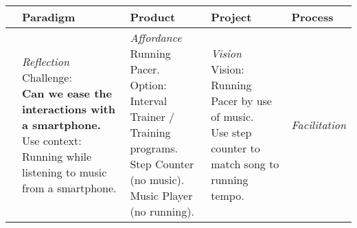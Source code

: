 \begin{table}
\begin{tabular}{l|l|l|l|l}
         & \textbf{Paradigm} & \textbf{Product} & \textbf{Project} & \textbf{Process} \\ \hline
\parbox[t][4cm][c]{0.02\textwidth}{} %
	& \parbox[t]{0.20\textwidth}{\small 
		\textit{Reflection} \newline
		Challenge: \newline
		\textbf{\color{darkGreen}Can we ease the interactions with a smartphone.} \newline
		Use context: \newline
		Running while listening to music from a smartphone.
	}
	& \parbox[t]{0.20\textwidth}{\small 
		\textit{Affordance} \newline
		Running Pacer. \newline
		Option: \newline
		Interval Trainer / Training programs. \newline
		Step Counter (no music). \newline
		Music Player (no running). \newline
	}
	& \parbox[t]{0.20\textwidth}{\small  
		\textit{Vision} \newline
		Vision: \newline
		Running Pacer by use of music. \newline
		Use step counter to match song to running tempo.
	}
    & \parbox[t]{0.20\textwidth}{\small 
	    \textit{Facilitation} \newline
	    
}
\end{tabular}
\end{table}
